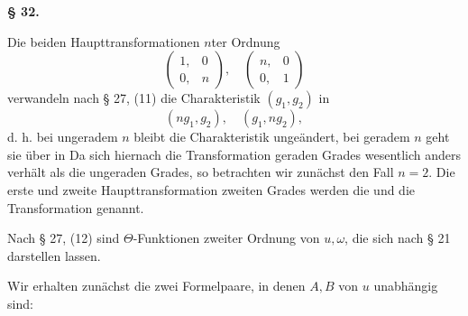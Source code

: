 
\begin{center}
\textbf{§ 32. }
\end{center}

Die beiden Haupttransformationen $n$ter Ordnung
\[
\begin{pmatrix} 1, & 0 \\ 0, & n \end{pmatrix}, \quad \begin{pmatrix} n, & 0 \\ 0, & 1 \end{pmatrix}
\]
verwandeln nach § 27, (11) die Charakteristik $(g_1, g_2)$ in
\[
(ng_1, g_2), \quad (g_1, ng_2),
\]
d. h. bei ungeradem $n$ bleibt die Charakteristik ungeändert, bei geradem $n$ geht sie über in
Da sich hiernach die Transformation geraden Grades wesentlich anders verhält als die ungeraden Grades, so betrachten wir zunächst den Fall $n = 2$. Die erste und zweite Haupttransformation zweiten Grades werden die  und die  Transformation genannt.

Nach § 27, (12) sind
$\Theta$-Funktionen zweiter Ordnung von $u, \omega$, die sich nach § 21 darstellen lassen.

Wir erhalten zunächst die zwei Formelpaare, in denen $A, B$ von $u$ unabhängig sind:
